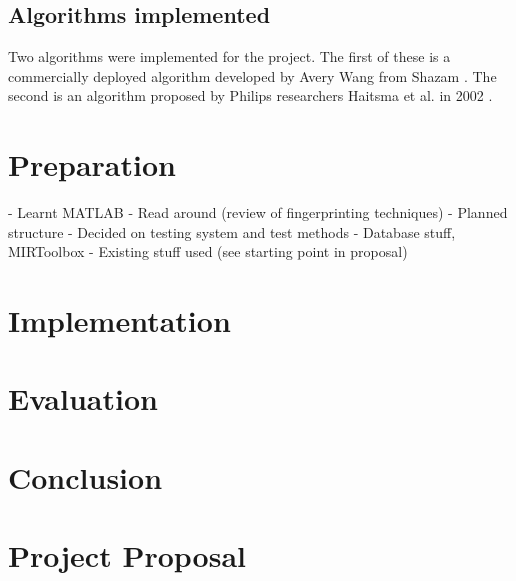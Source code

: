 \documentclass[12pt,a4paper,twoside,openright]{report}
\begin{document}
\section{Algorithms implemented}

Two algorithms were implemented for the project. The first of these is a commercially deployed algorithm developed by Avery Wang from Shazam \cite{Wang03}. The second is an algorithm proposed by Philips researchers Haitsma et al. in 2002 \cite{Haitsma02}.


\chapter{Preparation}

- Learnt MATLAB
- Read around (review of fingerprinting techniques)
- Planned structure
- Decided on testing system and test methods
- Database stuff, MIRToolbox
- Existing stuff used (see starting point in proposal)

\chapter{Implementation}




\chapter{Evaluation}



\chapter{Conclusion}






\appendix


\chapter{Project Proposal}


\end{document}
